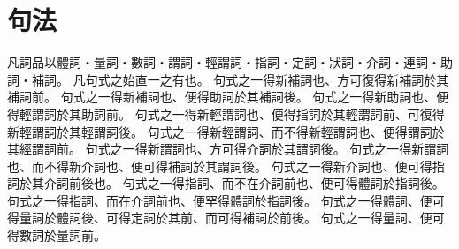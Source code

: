 \chapter{句法}
凡詞品以體詞・量詞・數詞・謂詞・輕謂詞・指詞・定詞・狀詞・介詞・連詞・助詞・補詞。
凡句式之始直一之有也。
句式之一得新補詞也、方可復得新補詞於其補詞前。
句式之一得新補詞也、便得助詞於其補詞後。
句式之一得新助詞也、便得輕謂詞於其助詞前。
句式之一得新輕謂詞也、便得指詞於其輕謂詞前、可復得新輕謂詞於其輕謂詞後。
句式之一得新輕謂詞、而不得新輕謂詞也、便得謂詞於其經謂詞前。
句式之一得新謂詞也、方可得介詞於其謂詞後。
句式之一得新謂詞也、而不得新介詞也、便可得補詞於其謂詞後。
句式之一得新介詞也、便可得指詞於其介詞前後也。
句式之一得指詞、而不在介詞前也、便可得體詞於指詞後。
句式之一得指詞、而在介詞前也、便罕得體詞於指詞後。
句式之一得體詞、便可得量詞於體詞後、可得定詞於其前、而可得補詞於前後。
句式之一得量詞、便可得數詞於量詞前。
